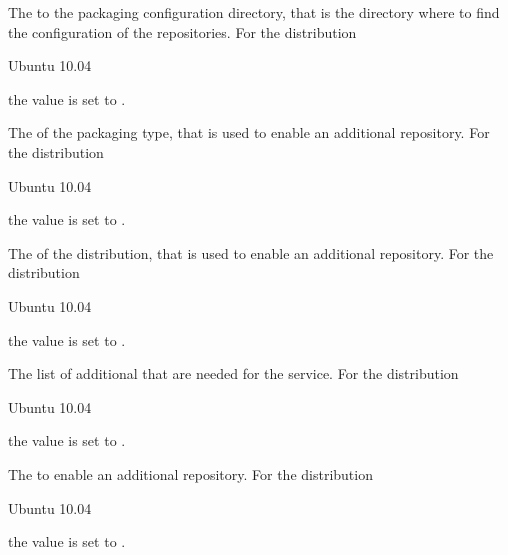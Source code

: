 The  to the packaging configuration directory, that is the directory
where to find the configuration of the repositories.
For the distribution
\begin{inparaitem}
\item[\TheDistribution{ubuntu}] Ubuntu 10.04
\end{inparaitem}
the value is set to .


The  of the packaging type, that is used to enable an additional
repository. For the distribution
\begin{inparaitem}
\item[\TheDistribution{ubuntu}] Ubuntu 10.04
\end{inparaitem}
the value is set to .


The  of the distribution, that is used to enable an additional
repository. For the distribution
\begin{inparaitem}
\item[\TheDistribution{ubuntu}] Ubuntu 10.04
\end{inparaitem}
the value is set to .


The list of additional  that are needed for the service. 
For the distribution
\begin{inparaitem}
\item[\TheDistribution{ubuntu}] Ubuntu 10.04
\end{inparaitem}
the value is set to .


The  to enable an additional repository.
For the distribution
\begin{inparaitem}
\item[\TheDistribution{ubuntu}] Ubuntu 10.04
\end{inparaitem}
the value is set to .

